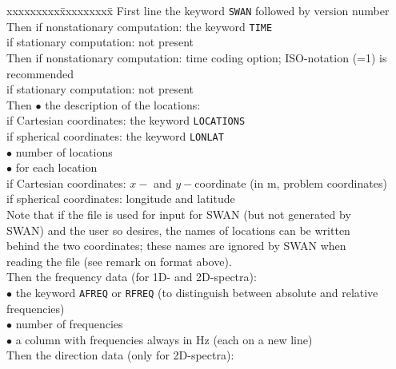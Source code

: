 \documentclass[12pt]{book}
\begin{document}
\begin{tabbing}
xxxxxxxxx\=xxxxxxxxx\= \kill
First line          \> the keyword {\tt SWAN} followed by version number\\
Then                \> if nonstationary computation: the keyword {\tt TIME}\+\\
                       if stationary computation: not present\-\\
Then                \> if nonstationary computation: time coding option; ISO-notation (=1) is recommended\+\\
                       if stationary computation: not present\-\\
Then                \> {$\bullet$} the description of the locations:\+\+\\
                       if Cartesian coordinates: the keyword {\tt LOCATIONS}\\
                       if spherical coordinates: the keyword {\tt LONLAT}\-\\
                       {$\bullet$} number of locations\\
                       {$\bullet$} for each location\+\\
                       if Cartesian coordinates: $x-$ and $y-$coordinate (in m, problem coordinates)\\
                       if spherical coordinates: longitude and latitude\\
                       Note that if the file is used for input for SWAN (but not generated by\\
                       SWAN) and the user so desires, the names of locations can be written\\
                       behind the two coordinates; these names are ignored by SWAN when\\
                       reading the file (see remark on format above).\-\-\\
Then                \> the frequency data (for 1D- and 2D-spectra):\+\\
                       {$\bullet$} the keyword {\tt AFREQ} or {\tt RFREQ} (to distinguish between absolute and relative frequencies)\\
                       {$\bullet$} number of frequencies\\
                       {$\bullet$} a column with frequencies always in Hz (each on a new line)\-\\
Then                \> the direction data (only for 2D-spectra):\+\\

\end{tabbing}
\end{document}
